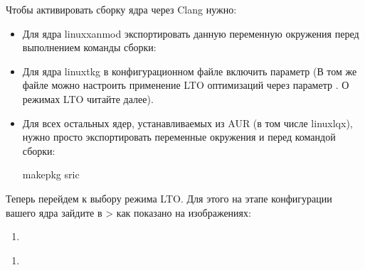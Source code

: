 \documentclass[letterpaper,10pt,russian,openany]{sphinxmanual}
\begin{document}
\sphinxAtStartPar
Чтобы активировать сборку ядра через Clang нужно:
\begin{itemize}
\item {} 
\sphinxAtStartPar
Для ядра linux\sphinxhyphen{}xanmod экспортировать данную переменную окружения перед выполнением команды сборки: 

\item {} 
\sphinxAtStartPar
Для ядра linux\sphinxhyphen{}tkg в конфигурационном файле  включить параметр 
(В том же файле можно настроить применение LTO оптимизаций через параметр . О режимах LTO читайте далее).

\item {} 
\sphinxAtStartPar
Для всех остальных ядер, устанавливаемых из AUR (в том числе linux\sphinxhyphen{}lqx), нужно просто экспортировать переменные окружения  и  перед командой сборки:

\begin{sphinxVerbatim}[commandchars=\\\{\}]
   
makepkg \PYGZhy{}sric            
\end{sphinxVerbatim}

\end{itemize}

\sphinxAtStartPar
Теперь перейдем к выбору режима LTO.
Для этого на этапе конфигурации вашего ядра зайдите в  \sphinxhyphen{}>
 как показано на изображениях:
\begin{enumerate}
%
\item {} 
\end{enumerate}

\noindent{}
\begin{enumerate}
%
\setcounter{enumi}{1}
\item {} 
\end{enumerate}
\end{document}
